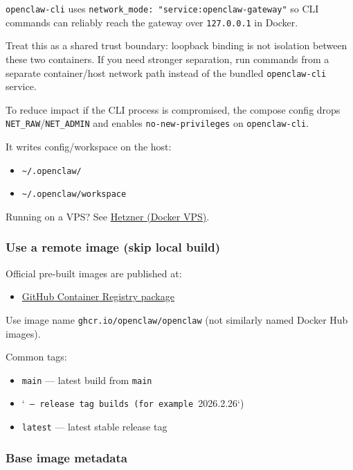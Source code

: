 \texttt{openclaw-cli} uses \texttt{network\_mode: "service:openclaw-gateway"} so CLI commands can
reliably reach the gateway over \texttt{127.0.0.1} in Docker.

Treat this as a shared trust boundary: loopback binding is not isolation between these two
containers. If you need stronger separation, run commands from a separate container/host
network path instead of the bundled \texttt{openclaw-cli} service.

To reduce impact if the CLI process is compromised, the compose config drops
\texttt{NET\_RAW}/\texttt{NET\_ADMIN} and enables \texttt{no-new-privileges} on \texttt{openclaw-cli}.

It writes config/workspace on the host:

\begin{itemize}
  \item \texttt{\textasciitilde{}/.openclaw/}
  \item \texttt{\textasciitilde{}/.openclaw/workspace}
\end{itemize}


Running on a VPS? See \href{/install/hetzner}{Hetzner (Docker VPS)}.

\subsubsection{Use a remote image (skip local build)}


Official pre-built images are published at:

\begin{itemize}
  \item \href{https://github.com/openclaw/openclaw/pkgs/container/openclaw}{GitHub Container Registry package}
\end{itemize}


Use image name \texttt{ghcr.io/openclaw/openclaw} (not similarly named Docker Hub
images).

Common tags:

\begin{itemize}
  \item \texttt{main} — latest build from \texttt{main}
  \item `\texttt{ — release tag builds (for example }2026.2.26`)
  \item \texttt{latest} — latest stable release tag
\end{itemize}


\subsubsection{Base image metadata}



